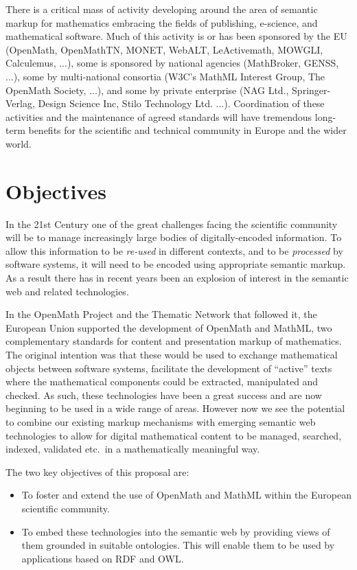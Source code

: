 \documentclass{euproposal}
\begin{document}
There is a critical mass of activity developing around the area of
semantic markup for mathematics embracing the fields of publishing,
e-science, and mathematical software.  Much of this activity is or has
been sponsored by the EU (OpenMath, OpenMathTN, MONET, WebALT,
LeActivemath, MOWGLI, Calculemus, ...), some is sponsored by national
agencies (MathBroker, GENSS, ...), some by multi-national consortia
(W3C's MathML Interest Group, The OpenMath Society, ...), and some by
private enterprise (NAG Ltd., Springer-Verlag, Design Science Inc,
Stilo Technology Ltd. ...).  Coordination of these activities and the
maintenance of agreed standards will have tremendous long-term
benefits for the scientific and technical community in Europe and the
wider world.




\chapter{Objectives}
\label{cha:object}

In the 21st Century one of the great challenges facing the scientific
community will be to manage increasingly large bodies of
digitally-encoded information.  To allow this information to be
\emph{re-used} in different contexts, and to be \emph{processed} by
software systems,
it will need to be encoded using appropriate semantic markup.  As a
result there has in recent years been an explosion of interest in the
semantic web and related technologies.

In the OpenMath Project and the Thematic Network that followed it, the
European Union supported the development of OpenMath and MathML, two
complementary standards for content and presentation markup of
mathematics.  The original intention was that these would be used to
exchange mathematical objects between software systems, facilitate the
development of ``active'' texts where the mathematical components
could be extracted, manipulated and checked.  As such, these
technologies have been a great success and are now beginning to be
used in a wide range of areas.  However now we see the potential to
combine our existing markup mechanisms with emerging semantic web
technologies to allow for digital mathematical content to be managed,
searched, indexed, validated etc.~in a mathematically meaningful way.

The two key objectives of this proposal are:
\begin{itemize}
\item To foster and extend the use of OpenMath and MathML within the
  European scientific community.
\item To embed these technologies into the semantic web by providing
  views of them grounded in suitable ontologies.  This will enable
  them to be used by applications based on RDF and OWL.
\end{itemize}
\end{document}
